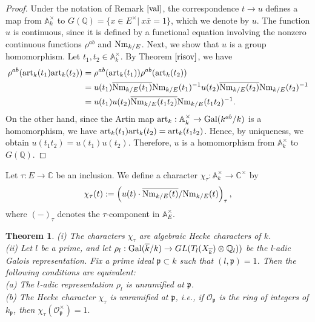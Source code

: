 \documentclass[reqno,a4paper,11pt]{amsart}
\newtheorem{thm}[dfn]{Theorem}
\theoremstyle{definition}
\theoremstyle{definition}
\begin{document}
    \begin{proof}
    Under the notation of Remark $\ref{val}$, the correspondence $t\to u$ defines a map from $\mathbb{A}^{\times}_{k}$ to $G(\mathbb{Q})=\{ x\in E^{\times} | ~x\overline{x}=1\}$, which we  denote by $u$. The function $u$ is continuous, since it is defined by a functional equation involving the nonzero continuous functions $\rho^{ab}$ and $ {\rm Nm}_{k/E}$. Next, we show that $u$ is a group homomorphism. Let $t_{1}, t_{2}\in \mathbb{A}^{\times}_{k}$. By Theorem $\ref{risov}$, we have
    \begin{align}
        \rho^{ab}({\rm art}_{k}(t_{1}){\rm art}_{k}(t_{2}))&=\rho^{ab}({\rm art}_{k}(t_{1}))\rho^{ab}({\rm art}_{k}(t_{2}))\notag
        \\&=u(t_{1})\overline{{\rm Nm}_{k/E}(t_{1})}{\rm Nm}_{k/E}(t_{1})^{-1}u(t_{2})\overline{{\rm Nm}_{k/E}(t_{2})}{\rm Nm}_{k/E}(t_{2})^{-1}\notag
        \\&=u(t_{1})u(t_{2})\overline{{\rm Nm}_{k/E}(t_{1}t_{2})}{\rm Nm}_{k/E}(t_{1}t_{2})^{-1}. \notag\end{align}
       \indent On the other hand, since the Artin map ${\rm art}_{k} : \mathbb{A}^{\times}_{k}\to {\rm Gal}(k^{ab}/k)$ is a homomorphism, we have ${\rm art}_{k}(t_{1}){\rm art}_{k}(t_{2})={\rm art}_{k}(t_{1}t_{2})$. Hence, by uniqueness, we obtain $u(t_{1}t_{2})=u(t_{1})u(t_{2})$. Therefore, $u$ is a homomorphism from $\mathbb{A}^{\times}_{k}$ to $G(\mathbb{Q})$.
    \end{proof}
    Let $\tau : E\to \mathbb{C}$ be an inclusion. We define a character $\chi_{\tau} : \mathbb{A}_{k}^{\times}\to \mathbb{C}^{\times}$ by
    \begin{align}
        \chi_{\tau}(t):=\left(u(t)\cdot \overline{{\rm Nm}_{k/E}(t)}/{\rm Nm}_{k/E}(t)\right)_{\tau},\notag
    \end{align}
    where $(-)_{\tau}$ denotes the $\tau$-component in $\mathbb{A}^{\times}_{E}$.
\begin{thm}
(i) The characters $\chi_{\tau}$ are algebraic Hecke characters of $k$.
\\(ii)
     Let $l$ be a prime, and let $\rho_{l} : {\rm Gal}(\overline{k}/k)\to GL(T_{l}(X_{\overline{k}})\otimes\mathbb{Q}_{l}))$ be the l-adic Galois representation. Fix a prime ideal $\mathfrak{p}\subset k$ such that $(l, \mathfrak{p})=1$. Then the following conditions are equivalent: 
     \\(a) The $l$-adic representation $\rho_{l}$ is unramified at $\mathfrak{p}$.
     \\(b) The Hecke character $\chi_{\tau}$ is unramified at $\mathfrak{p}$, i.e., if $\mathscr{O}_{\mathfrak{p}}$ is the ring of integers of $k_{\mathfrak{p}}$, then $\chi_{\tau}(\mathscr{O}^{\times}_{\mathfrak{p}})=1.$
    \end{thm}
\end{document}
